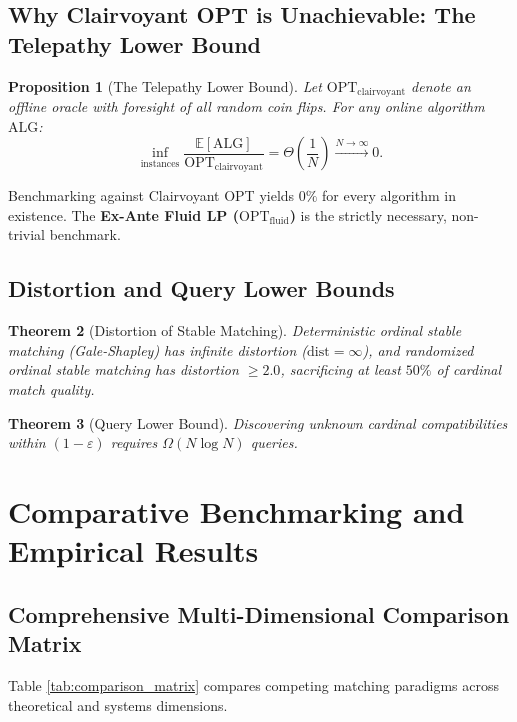 \documentclass[11pt,letterpaper]{article}
\theoremstyle{definition}
\theoremstyle{plain}
\newtheorem{theorem}{Theorem}[section]
\newtheorem{proposition}[theorem]{Proposition}
\theoremstyle{remark}
\begin{document}
\subsection{Why Clairvoyant OPT is Unachievable: The Telepathy Lower Bound}
\begin{proposition}[The Telepathy Lower Bound]
Let $\mathrm{OPT}_{\text{clairvoyant}}$ denote an offline oracle with foresight of all random coin flips. For any online algorithm $\mathrm{ALG}$:
\begin{equation}
    \inf_{\text{instances}} \frac{\mathbb{E}[\mathrm{ALG}]}{\mathrm{OPT}_{\text{clairvoyant}}} = \Theta\left(\frac{1}{N}\right) \xrightarrow{N \to \infty} 0.
\end{equation}
\end{proposition}
\begin{takeawaybox}
Benchmarking against Clairvoyant OPT yields $0\%$ for every algorithm in existence. The \textbf{Ex-Ante Fluid LP ($\mathrm{OPT}_{\text{fluid}}$)} is the strictly necessary, non-trivial benchmark.
\end{takeawaybox}

\subsection{Distortion and Query Lower Bounds}
\begin{theorem}[Distortion of Stable Matching]
Deterministic ordinal stable matching (Gale-Shapley) has infinite distortion ($\mathrm{dist} = \infty$), and randomized ordinal stable matching has distortion $\ge 2.0$, sacrificing at least $50\%$ of cardinal match quality.
\end{theorem}

\begin{theorem}[Query Lower Bound]
Discovering unknown cardinal compatibilities within $(1 - \varepsilon)$ requires $\Omega(N \log N)$ queries.
\end{theorem}

\newpage
\section{Comparative Benchmarking and Empirical Results}
\label{sec:benchmarks}

\subsection{Comprehensive Multi-Dimensional Comparison Matrix}
Table \ref{tab:comparison_matrix} compares competing matching paradigms across theoretical and systems dimensions.
\end{document}
